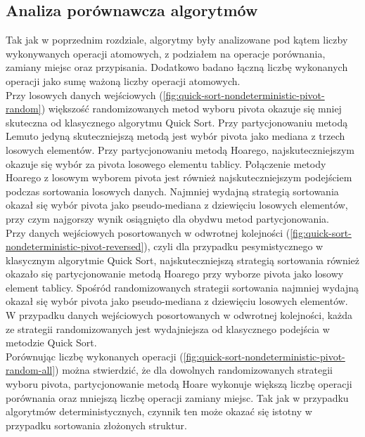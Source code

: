 \subsection{Analiza porównawcza algorytmów}
Tak jak w poprzednim rozdziale, algorytmy były analizowane pod kątem liczby wykonywanych operacji atomowych, z podziałem na operacje porównania, zamiany miejsc oraz przypisania. Dodatkowo badano łączną liczbę wykonanych operacji jako sumę ważoną liczby operacji atomowych.\\

Przy losowych danych wejściowych (\ref{fig:quick-sort-nondeterministic-pivot-random}) większość randomizowanych metod wyboru pivota okazuje się mniej skuteczna od klasycznego algorytmu Quick Sort. Przy partycjonowaniu metodą Lemuto jedyną skuteczniejszą metodą jest wybór pivota jako mediana z trzech losowych elementów. Przy partycjonowaniu metodą Hoarego, najskuteczniejszym okazuje się wybór za pivota losowego elementu tablicy. Połączenie metody Hoarego z losowym wyborem pivota jest również najskuteczniejszym podejściem podczas sortowania losowych danych. Najmniej wydajną strategią sortowania okazał się wybór pivota jako pseudo-mediana z dziewięciu losowych elementów, przy czym najgorszy wynik osiągnięto dla obydwu metod partycjonowania.\\

Przy danych wejściowych posortowanych w odwrotnej kolejności (\ref{fig:quick-sort-nondeterministic-pivot-reversed}), czyli dla przypadku pesymistycznego w klasycznym algorytmie Quick Sort, najskuteczniejszą strategią sortowania również okazało się partycjonowanie metodą Hoarego przy wyborze pivota jako losowy element tablicy. Spośród randomizowanych strategii sortowania najmniej wydajną okazał się wybór pivota jako pseudo-mediana z dziewięciu losowych elementów. W przypadku danych wejściowych posortowanych w odwrotnej kolejności, każda ze strategii randomizowanych jest wydajniejsza od klasycznego podejścia w metodzie Quick Sort.\\

Porównując liczbę wykonanych operacji (\ref{fig:quick-sort-nondeterministic-pivot-random-all}) można stwierdzić, że dla dowolnych randomizowanych strategii wyboru pivota, partycjonowanie metodą Hoare wykonuje większą liczbę operacji porównania oraz mniejszą liczbę operacji zamiany miejsc. Tak jak w przypadku algorytmów deterministycznych, czynnik ten może okazać się istotny w przypadku sortowania złożonych struktur.\\


